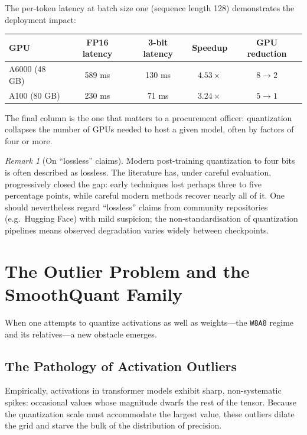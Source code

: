 \documentclass[11pt,a4paper]{article}
\theoremstyle{definition}
\theoremstyle{remark}
\newtheorem*{remark}{Remark}
\theoremstyle{plain}
\begin{document}
The per-token latency at batch size one (sequence length 128)
demonstrates the deployment impact:

\begin{center}
\renewcommand{\arraystretch}{1.25}
\begin{tabular}{@{}lcccc@{}}
\toprule
\textbf{GPU} & \textbf{FP16 latency} & \textbf{3-bit latency} & \textbf{Speedup} & \textbf{GPU reduction} \\
\midrule
A6000 (48 GB) & 589 ms & 130 ms & $4.53\times$ & $8 \to 2$ \\
A100 (80 GB)  & 230 ms & 71 ms  & $3.24\times$ & $5 \to 1$ \\
\bottomrule
\end{tabular}
\end{center}

The final column is the one that matters to a procurement officer:
quantization collapses the number of GPUs needed to host a given model,
often by factors of four or more.

\begin{remark}[On ``lossless'' claims]
Modern post-training quantization to four bits is often described as
lossless. The literature has, under careful evaluation, progressively
closed the gap: early techniques lost perhaps three to five percentage
points, while careful modern methods recover nearly all of it. One should
nevertheless regard ``lossless'' claims from community repositories (e.g.\
Hugging Face) with mild suspicion; the non-standardisation of quantization
pipelines means observed degradation varies widely between checkpoints.
\end{remark}

\section{The Outlier Problem and the SmoothQuant Family}
\label{sec:smoothquant}

When one attempts to quantize activations as well as weights---the
\texttt{W8A8} regime and its relatives---a new obstacle emerges.

\subsection{The Pathology of Activation Outliers}

Empirically, activations in transformer models exhibit sharp,
non-systematic spikes: occasional values whose magnitude dwarfs the rest of
the tensor. Because the quantization scale must accommodate the largest
value, these outliers dilate the grid and starve the bulk of the
distribution of precision.
\end{document}
